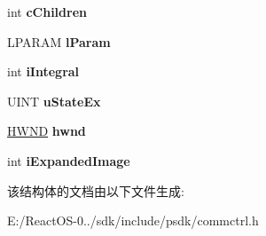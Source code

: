 \begin{DoxyCompactItemize}
int {\bfseries c\+Children}
\item 
\mbox{\label{structtag_t_v_i_t_e_m_e_x_a_aeb08580139e832591a36a18ac76c7b49}} 
L\+P\+A\+R\+AM {\bfseries l\+Param}
\item 
\mbox{\label{structtag_t_v_i_t_e_m_e_x_a_a35ddfd844649a19a9535c827576dca96}} 
int {\bfseries i\+Integral}
\item 
\mbox{\label{structtag_t_v_i_t_e_m_e_x_a_a20162080925b3d591d6b78547806a51c}} 
U\+I\+NT {\bfseries u\+State\+Ex}
\item 
\mbox{\label{structtag_t_v_i_t_e_m_e_x_a_ac8e9250c10daaea325a8e4e029a3c7a7}} 
\hyperlink{interfacevoid}{H\+W\+ND} {\bfseries hwnd}
\item 
\mbox{\label{structtag_t_v_i_t_e_m_e_x_a_a04dcb45f6ec7eda7ca8fd0766286abc3}} 
int {\bfseries i\+Expanded\+Image}
\end{DoxyCompactItemize}


该结构体的文档由以下文件生成\+:\begin{DoxyCompactItemize}
\item 
E\+:/\+React\+O\+S-\/0../sdk/include/psdk/commctrl.\+h\end{DoxyCompactItemize}
